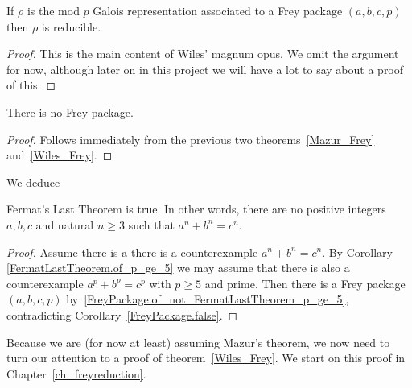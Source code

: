 \begin{theorem}
  \label{Wiles_Frey}
  \leanok
  If $\rho$ is the mod $p$ Galois representation associated to a Frey package $(a,b,c,p)$ then
  $\rho$ is reducible.
\end{theorem}
\begin{proof}
  This is the main content of Wiles' magnum opus.
  We omit the argument for now, although later on in this project
  we will have a lot to say about a proof of this.
\end{proof}

\begin{corollary}
  \label{FreyPackage.false}
  \leanok
  There is no Frey package.
\end{corollary}
\begin{proof}\leanok Follows immediately from the previous two
  theorems~\ref{Mazur_Frey} and~\ref{Wiles_Frey}.
\end{proof}

We deduce

\begin{corollary}
  \label{FLT}
  \leanok
  Fermat's Last Theorem is true. In other words, there are no positive integers $a,b,c$ and
  natural $n\geq3$ such that $a^n+b^n=c^n$.
\end{corollary}
\begin{proof}
  \leanok
  Assume there is a there is a counterexample $a^n+b^n=c^n$.
  By Corollary \ref{FermatLastTheorem.of_p_ge_5} we may assume that there is also a counterexample
  $a^p+b^p=c^p$ with $p\geq 5$ and prime.
  Then there is a Frey package $(a,b,c,p)$ by~\ref{FreyPackage.of_not_FermatLastTheorem_p_ge_5},
  contradicting Corollary~\ref{FreyPackage.false}.
\end{proof}

Because we are (for now at least) assuming Mazur's theorem, we now need to turn our attention
to a proof of theorem~\ref{Wiles_Frey}. We start on this proof in Chapter~\ref{ch_freyreduction}.

